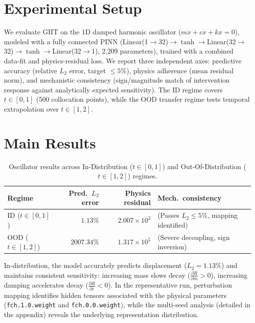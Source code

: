 \documentclass{article}
\begin{document}
\section{Experimental Setup}
\label{sec:setup}
We evaluate GIIT on the 1D damped harmonic oscillator
($m\ddot{x}+c\dot{x}+kx=0$), modeled with a fully connected PINN
(Linear(1$\to$32)$\to\tanh\to$Linear(32$\to$32)$\to\tanh\to$Linear(32$\to$1), 2{,}209
parameters), trained with a combined data-fit and physics-residual loss.
We report three independent axes: predictive accuracy (relative $L_2$
error, target $\leq5\%$), physics adherence (mean residual norm), and
mechanistic consistency (sign/magnitude match of intervention response
against analytically expected sensitivity). The ID regime covers $t \in [0, 1]$ (500 collocation points),
while the OOD transfer regime tests temporal extrapolation over $t \in [1, 2]$.

\section{Main Results}
\label{sec:results}

\begin{table}[h]
\caption{Oscillator results across In-Distribution ($t\in[0,1]$) and Out-Of-Distribution ($t\in[1,2]$) regimes.}
\label{tab:main}
\centering
\small
\begin{tabular}{lrrl}
\toprule
Regime & Pred.\ $L_2$ error & Physics residual & Mech.\ consistency \\
\midrule
ID ($t \in [0, 1]$)  & $1.13\%$ & $2.007\times10^{2}$ &  (Passes $L_2 \le 5\%$, mapping identified) \\
OOD ($t \in [1, 2]$) & $2007.34\%$ & $1.317\times10^{5}$ &  (Severe decoupling, sign inversion) \\
\bottomrule
\end{tabular}
\end{table}

In-distribution, the model accurately predicts displacement ($L_2 = 1.13\%$) and maintains consistent sensitivity:
increasing mass slows decay ($\frac{\partial R}{\partial m} > 0$), increasing damping accelerates decay ($\frac{\partial R}{\partial c} < 0$).
In the representative run, perturbation mapping identifies hidden tensors associated with the physical parameters (\texttt{fch.1.0.weight} and \texttt{fch.0.0.weight}), while the multi-seed analysis (detailed in the appendix) reveals the underlying representation distribution.
\end{document}
